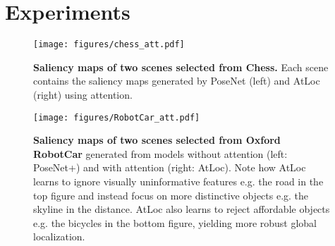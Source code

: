 \documentclass[letterpaper]{article}
\begin{document}
\section{Experiments}
\begin{figure}[t]
    \centering
    \texttt{[image: figures/chess\_att.pdf]}
    \vspace{-0.2cm}
    \caption{\textbf{Saliency maps of two scenes selected from Chess.} Each scene contains the saliency maps generated by PoseNet (left) and AtLoc (right) using attention.}
    \label{fig:chess_att}
\vspace{-0.5cm}
\end{figure}

\begin{figure}[t]
    \centering
    \texttt{[image: figures/RobotCar\_att.pdf]}
     \vspace{-0.2cm}
    \caption{\textbf{Saliency maps of two scenes selected from Oxford RobotCar} generated from models without attention (left: PoseNet+) and with attention (right: AtLoc). Note how AtLoc learns to ignore visually uninformative features e.g. the road in the top figure and instead focus on more distinctive objects e.g. the skyline in the distance. AtLoc also learns to reject affordable objects e.g. the bicycles in the bottom figure, yielding more robust global localization.}
    \label{fig:robotcar_att}
\vspace{-0.5cm}
\end{figure}
\end{document}
